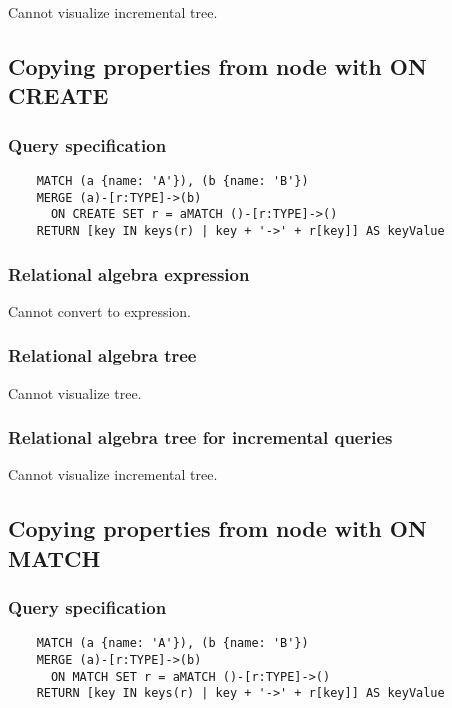 	Cannot visualize incremental tree.
	\subsection{Copying properties from node with ON CREATE}

	\subsubsection*{Query specification}

	\begin{lstlisting}
	MATCH (a {name: 'A'}), (b {name: 'B'})
	MERGE (a)-[r:TYPE]->(b)
	  ON CREATE SET r = aMATCH ()-[r:TYPE]->()
	RETURN [key IN keys(r) | key + '->' + r[key]] AS keyValue
	\end{lstlisting}


	\subsubsection*{Relational algebra expression}

	Cannot convert to expression.

	\subsubsection*{Relational algebra tree}

	Cannot visualize tree.

	\subsubsection*{Relational algebra tree for incremental queries}

	Cannot visualize incremental tree.
	\subsection{Copying properties from node with ON MATCH}

	\subsubsection*{Query specification}

	\begin{lstlisting}
	MATCH (a {name: 'A'}), (b {name: 'B'})
	MERGE (a)-[r:TYPE]->(b)
	  ON MATCH SET r = aMATCH ()-[r:TYPE]->()
	RETURN [key IN keys(r) | key + '->' + r[key]] AS keyValue
	\end{lstlisting}


